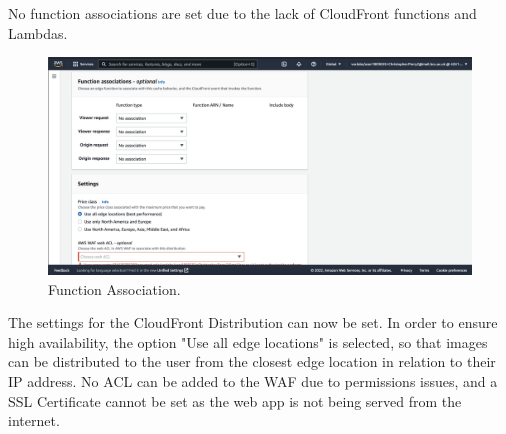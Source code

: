No function associations are set due to the lack of CloudFront functions and Lambdas.

\begin{figure}[!htbp]
    \centering
    \includegraphics[width=\textwidth]{resources/cloudfront/cloudfront-function-association}
    \caption{Function Association.}
    \label{fig:cloudfront-function-association}
\end{figure}

The settings for the CloudFront Distribution can now be set.
In order to ensure high availability, the option "Use all edge locations" is selected, so that images can be distributed
to the user from the closest edge location in relation to their IP address.
No ACL can be added to the WAF due to permissions issues, and a SSL Certificate cannot be set as the web app is not being
served from the internet.



